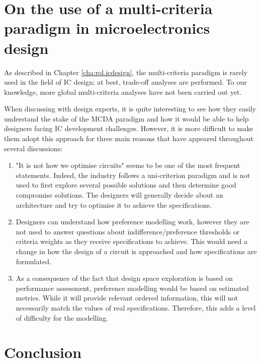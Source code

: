 \section{On the use of a multi-criteria paradigm in microelectronics design}
As described in Chapter \ref{cha:rol.icdesign}, the multi-criteria paradigm is rarely used in the field of IC design; at best, trade-off analyses are performed. To our knowledge, more global multi-criteria analyses have not been carried out yet.

When discussing with design experts, it is quite interesting to see how they easily understand the stake of the MCDA paradigm and how it would be able to help designers facing IC development challenges. However, it is more difficult to make them adopt this approach for three main reasons that have appeared throughout several discussions:

\begin{enumerate}
\item "It is not how we optimise circuits" seems to be one of the most frequent statements. Indeed, the industry follows a uni-criterion paradigm and is not used to first explore several possible solutions and then determine good compromise solutions. The designers will generally decide about an architecture and try to optimise it to achieve the specifications.
\item Designers can understand how preference modelling work, however they are not used to answer questions about indifference/preference thresholds or criteria weights as they receive specifications to achieve. This would need a change in how the design of a circuit is approached and how specifications are formulated.
\item As a consequence of the fact that design space exploration is based on performance assessment, preference modelling would be based on estimated metrics. While it will provide relevant ordered information, this will not necessarily match the values of real specifications. Therefore, this adds a level of difficulty for the modelling.
\end{enumerate}



\section{Conclusion}